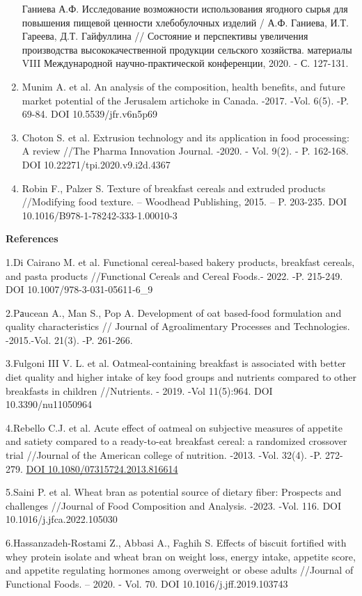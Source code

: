 \begin{enumerate}
  Ганиева А.Ф. Исследование возможности использования ягодного сырья для
  повышения пищевой ценности хлебобулочных изделий / А.Ф. Ганиева, И.Т.
  Гареева, Д.Т. Гайфуллина // Состояние и перспективы увеличения
  производства высококачественной продукции сельского хозяйства.
  материалы VIII Международной научно-практической конференции, 2020. -
  С. 127-131.
\item
  Munim A. et al. An analysis of the composition, health benefits, and
  future market potential of the Jerusalem artichoke in Canada. -2017.
  -Vol. 6(5). -P. 69-84. DOI 10.5539/jfr.v6n5p69
\item
  Choton S. et al. Extrusion technology and its application in food
  processing: A review //The Pharma Innovation Journal. -2020. - Vol.
  9(2). - P. 162-168. DOI 10.22271/tpi.2020.v9.i2d.4367
\item
  Robin F., Palzer S. Texture of breakfast cereals and extruded products
  //Modifying food texture. -- Woodhead Publishing, 2015. -- P. 203-235.
  DOI 10.1016/B978-1-78242-333-1.00010-3
\end{enumerate}

{\bfseries References}

1.Di Cairano M. et al. Functional cereal-based bakery products,
breakfast cereals, and pasta products //Functional Cereals and Cereal
Foods.- 2022. -P. 215-249. DOI 10.1007/978-3-031-05611-6\_9

2.Pаucean A., Man S., Pop A. Development of oat based-food formulation
and quality characteristics // Journal of Agroalimentary Processes and
Technologies. -2015.-Vol. 21(3). -P. 261-266.

3.Fulgoni III V. L. et al. Oatmeal-containing breakfast is associated
with better diet quality and higher intake of key food groups and
nutrients compared to other breakfasts in children //Nutrients. - 2019.
-Vol 11(5):964. DOI 10.3390/nu11050964

4.Rebello C.J. et al. Acute effect of oatmeal on subjective measures of
appetite and satiety compared to a ready-to-eat breakfast cereal: a
randomized crossover trial //Journal of the American college of
nutrition. -2013. -Vol. 32(4). -P. 272-279.
\href{https://doi.org/10.1080/07315724.2013.816614}{DOI
10.1080/07315724.2013.816614}

5.Saini P. et al. Wheat bran as potential source of dietary fiber:
Prospects and challenges //Journal of Food Composition and Analysis.
-2023. -Vol. 116. DOI 10.1016/j.jfca.2022.105030

6.Hassanzadeh-Rostami Z., Abbasi A., Faghih S. Effects of biscuit
fortified with whey protein isolate and wheat bran on weight loss,
energy intake, appetite score, and appetite regulating hormones among
overweight or obese adults //Journal of Functional Foods. -- 2020. -
Vol. 70. DOI 10.1016/j.jff.2019.103743

